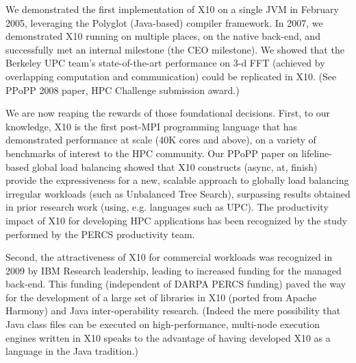 We demonstrated the first implementation of X10 on a single JVM in
February 2005, leveraging the Polyglot (Java-based) compiler
framework. In 2007, we demonstrated X10 running on multiple places, on
the native back-end, and successfully met an internal milestone (the
CEO milestone). We showed that the Berkeley UPC team's
state-of-the-art performance on 3-d FFT (achieved by overlapping
computation and communication) could be replicated in X10. (See PPoPP
2008 paper, HPC Challenge submission award.)

We are now reaping the rewards of those foundational decisions. First,
to our knowledge, X10 is the first post-MPI programming language that
has demonstrated performance at scale (40K cores and above), on a
variety of benchmarks of interest to the HPC community. Our PPoPP
paper on lifeline-based global load balancing showed that X10
constructs (async, at, finish) provide the expressiveness for a new,
scalable approach to globally load balancing irregular workloads (such
as Unbalanced Tree Search), surpassing results obtained in prior
research work (using, e.g. languages such as UPC). The productivity
impact of X10 for developing HPC applications has been recognized by
the study performed by the PERCS  productivity team. 

Second, the attractiveness of X10 for commercial workloads was
recognized in 2009 by IBM Research leadership, leading to increased
funding for the managed back-end. This funding (independent of DARPA
PERCS funding)  paved the way for the development of a large set of
libraries in X10 (ported from Apache Harmony) and Java
inter-operability research. (Indeed the mere possibility that Java
class files can be executed on high-performance, multi-node execution
engines written in X10 speaks to the advantage of having developed X10
as a language in the Java tradition.)

